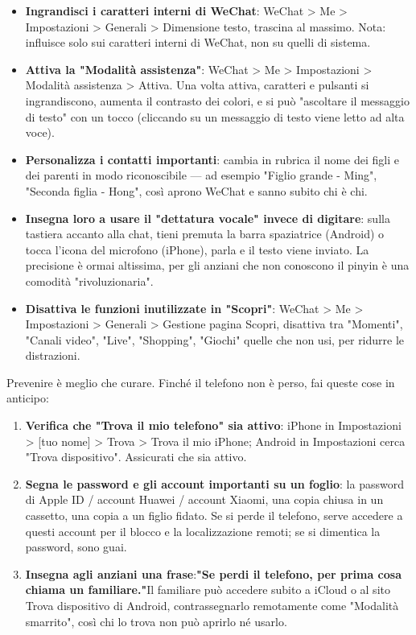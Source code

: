 \begin{itemize}
  \item \textbf{Ingrandisci i caratteri interni di WeChat}: WeChat > Me > Impostazioni > Generali > Dimensione testo, trascina al massimo. Nota: influisce solo sui caratteri interni di WeChat, non su quelli di sistema.
  \item \textbf{Attiva la "Modalità assistenza"}: WeChat > Me > Impostazioni > Modalità assistenza > Attiva. Una volta attiva, caratteri e pulsanti si ingrandiscono, aumenta il contrasto dei colori, e si può "ascoltare il messaggio di testo" con un tocco (cliccando su un messaggio di testo viene letto ad alta voce).
  \item \textbf{Personalizza i contatti importanti}: cambia in rubrica il nome dei figli e dei parenti in modo riconoscibile — ad esempio "Figlio grande - Ming", "Seconda figlia - Hong", così aprono WeChat e sanno subito chi è chi.
  \item \textbf{Insegna loro a usare il "dettatura vocale" invece di digitare}: sulla tastiera accanto alla chat, tieni premuta la barra spaziatrice (Android) o tocca l'icona del microfono (iPhone), parla e il testo viene inviato. La precisione è ormai altissima, per gli anziani che non conoscono il pinyin è una comodità "rivoluzionaria".
  \item \textbf{Disattiva le funzioni inutilizzate in "Scopri"}: WeChat > Me > Impostazioni > Generali > Gestione pagina Scopri, disattiva tra "Momenti", "Canali video", "Live", "Shopping", "Giochi" quelle che non usi, per ridurre le distrazioni.
\end{itemize}


Prevenire è meglio che curare. Finché il telefono non è perso, fai queste cose in anticipo:

\begin{enumerate}
  \item \textbf{Verifica che "Trova il mio telefono" sia attivo}: iPhone in Impostazioni > [tuo nome] > Trova > Trova il mio iPhone; Android in Impostazioni cerca "Trova dispositivo". Assicurati che sia attivo.
  \item \textbf{Segna le password e gli account importanti su un foglio}: la password di Apple ID / account Huawei / account Xiaomi, una copia chiusa in un cassetto, una copia a un figlio fidato. Se si perde il telefono, serve accedere a questi account per il blocco e la localizzazione remoti; se si dimentica la password, sono guai.
  \item \textbf{Insegna agli anziani una frase}:\textbf{"Se perdi il telefono, per prima cosa chiama un familiare."}Il familiare può accedere subito a iCloud o al sito Trova dispositivo di Android, contrassegnarlo remotamente come "Modalità smarrito", così chi lo trova non può aprirlo né usarlo.
\end{enumerate}

